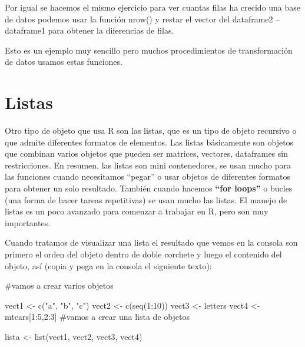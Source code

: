 \documentclass[
  letterpaper,
  DIV=11,
  numbers=noendperiod]{scrreprt}
\newenvironment{Shaded}{\begin{snugshade}}{\end{snugshade}}
\newcommand{\CommentTok}[1]{\textcolor[rgb]{0.37,0.37,0.37}{#1}}
\newcommand{\DecValTok}[1]{\textcolor[rgb]{0.68,0.00,0.00}{#1}}
\newcommand{\FunctionTok}[1]{\textcolor[rgb]{0.28,0.35,0.67}{#1}}
\newcommand{\NormalTok}[1]{\textcolor[rgb]{0.00,0.23,0.31}{#1}}
\newcommand{\OtherTok}[1]{\textcolor[rgb]{0.00,0.23,0.31}{#1}}
\newcommand{\SpecialCharTok}[1]{\textcolor[rgb]{0.37,0.37,0.37}{#1}}
\newcommand{\StringTok}[1]{\textcolor[rgb]{0.13,0.47,0.30}{#1}}
\begin{document}
Por igual se hacemos el mismo ejercicio para ver cuantas filas ha
crecido una base de datos podemos usar la función nrow() y restar el
vector del dataframe2 -- dataframe1 para obtener la diferencias de
filas.

Esto es un ejemplo muy sencillo pero muchos procedimientos de
transformación de datos usamos estas funciones.

\section{Listas}\label{listas}

Otro tipo de objeto que usa R son las listas, que es un tipo de objeto
recursivo o que admite diferentes formatos de elementos. Las listas
básicamente son objetos que combinan varios objetos que pueden ser
matrices, vectores, dataframes sin restricciones. En resumen, las listas
son mini contenedores, se usan mucho para las funciones cuando
necesitamos ``pegar'' o usar objetos de diferentes formatos para obtener
un solo resultado. También cuando hacemos \textbf{``for loops''} o
bucles (una forma de hacer tareas repetitivas) se usan mucho las listas.
El manejo de listas es un poco avanzado para comenzar a trabajar en R,
pero son muy importantes.

Cuando tratamos de visualizar una lista el resultado que vemos en la
consola son primero el orden del objeto dentro de doble corchete y luego
el contenido del objeto, así (copia y pega en la consola el siguiente
texto):

\begin{Shaded}
\begin{Highlighting}[]
\CommentTok{\#vamos a crear varios objetos }

\NormalTok{vect1 }\OtherTok{\textless{}{-}} \FunctionTok{c}\NormalTok{(}\StringTok{"a"}\NormalTok{, }\StringTok{"b"}\NormalTok{, }\StringTok{"c"}\NormalTok{)}
\NormalTok{vect2 }\OtherTok{\textless{}{-}} \FunctionTok{c}\NormalTok{(}\FunctionTok{seq}\NormalTok{(}\DecValTok{1}\SpecialCharTok{:}\DecValTok{10}\NormalTok{))}
\NormalTok{vect3 }\OtherTok{\textless{}{-}}\NormalTok{ letters}
\NormalTok{vect4 }\OtherTok{\textless{}{-}}\NormalTok{ mtcars[}\DecValTok{1}\SpecialCharTok{:}\DecValTok{5}\NormalTok{,}\DecValTok{2}\SpecialCharTok{:}\DecValTok{3}\NormalTok{]}
\CommentTok{\#vamos a crear una lista de objetos}

\NormalTok{lista }\OtherTok{\textless{}{-}} \FunctionTok{list}\NormalTok{(vect1, vect2, vect3, vect4)}
\end{Highlighting}
\end{Shaded}
\end{document}
